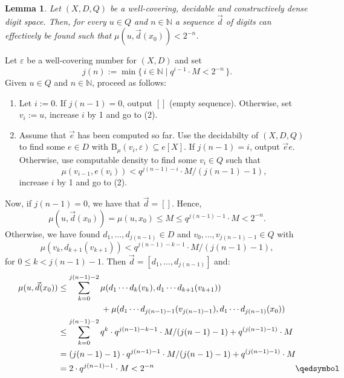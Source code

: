 \documentclass[microtype]{jloganal}
\theoremstyle{plain}
\newtheorem{lemma}[theorem]{Lemma}
\theoremstyle{definition}
\newcommand{\NN}{\mathbb{N}}
\newcommand{\ball}[3]{\mathrm{B}_{#1}(#2,#3)}
\newcommand{\set}[2]{\mbox{$\{\,#1 \mid #2 \,\}$}}
\begin{document}
\begin{lemma}
\label{lem-Q-QD}
Let $(X, D, Q)$ be a well-covering, decidable and constructively dense digit space. Then, for every $u \in Q$ and $n \in \NN$ a sequence $\vec d$ of digits can effectively be found such that $\mu(u, \vec d(x_0)) < 2^{-n}$.
\end{lemma}
\proof
Let $\varepsilon$ be a well-covering number for $(X, D)$ and set
\[
j(n) := \min\set{i \in \NN}{q^{i-1} \cdot M < 2^{-n}}.
\]
Given $u \in Q$ and $n \in \NN$, proceed as follows:
\begin{enumerate}
\item Let $i := 0$.  If $j(n-1) = 0$, output $[]$ (empty sequence). Otherwise, set $v_i := u$, increase $i$ by 1 and go to (2).

\item Assume that $\vec e$ has been computed so far. Use the decidabilty of $(X, D, Q)$ to find some $e \in D$ with $\ball{\mu}{v_i}{\varepsilon} \subseteq e[X]$.
If $j(n-1) = i$, output $\vec{e}e$. Otherwise, use computable density to find some $v_i \in Q$ such that
\[
\mu(v_{i-1}, e(v_i)) < q^{j(n-1) - i} \cdot M/(j(n-1)-1),
\]
increase $i$ by 1 and go to (2).

\end{enumerate}

Now, if $j(n-1) = 0$, we have that $\vec d = []$. Hence,
\[
\mu(u, \vec d(x_0)) = \mu(u, x_0) \le M \le q^{j(n-1)-1} \cdot M < 2^{-n}.
\]
Otherwise, we have found $d_1, \ldots, d_{j(n-1)} \in D$ and $v_0, \ldots, v_{j(n-1)-1} \in Q$ with
\[
\mu(v_k, d_{k+1}(v_{k+1})) < q^{j(n-1)-k-1} \cdot M/(j(n-1)-1),
\]
for $0 \le k < j(n-1)-1$. Then $\vec d = [d_1, \ldots, d_{j(n-1)}]$ and: 
\begin{align*}
\mu(u, \vec d(x_0))
&\le \sum_{k=0}^{j(n-1)-2} \mu(d_1\cdots d_k(v_{k}), d_1 \cdots d_{k+1}(v_{k+1}))\\
 &\hspace{1.8cm}+ \mu(d_1 \cdots d_{j(n-1)-1}(v_{j(n-1)-1}), d_1 \cdots d_{j(n-1)}(x_0))\\
&\le \sum_{k=0}^{j(n-1)-2} q^k \cdot q^{j(n-1)-k-1} \cdot M/(j(n-1)-1) + q^{(j(n-1)-1)} \cdot M\\
& = (j(n-1)-1) \cdot q^{j(n-1)-1} \cdot M/(j(n-1)-1) + q^{(j(n-1)-1)} \cdot M\\ 
&= 2 \cdot q^{j(n-1)-1} \cdot M < 2^{-n} \rlap{\hspace{16.4em} \qedsymbol}
\end{align*}
\end{document}
